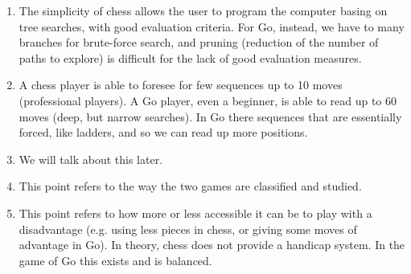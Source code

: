 \begin{enumerate}
\item The simplicity of chess allows the user to program the computer basing on tree searches, with good evaluation criteria. For Go, instead, we have to many branches for brute-force search, and pruning (reduction of the number of paths to explore) is difficult for the lack of good evaluation measures.
\item A chess player is able to foresee for few sequences up to 10 moves (professional players). A Go player, even a beginner, is able to read up to 60 moves (deep, but narrow searches). In Go there sequences that are essentially forced, like ladders, and so we can read up more positions.
\item We will talk about this later.
\item This point refers to the way the two games are classified and studied.
\item This point refers to how more or less accessible it can be to play with a disadvantage (e.g. using less pieces in chess, or giving some moves of advantage in Go). In theory, chess does not provide a handicap system. In the game of Go this exists and is balanced.
\end{enumerate}

